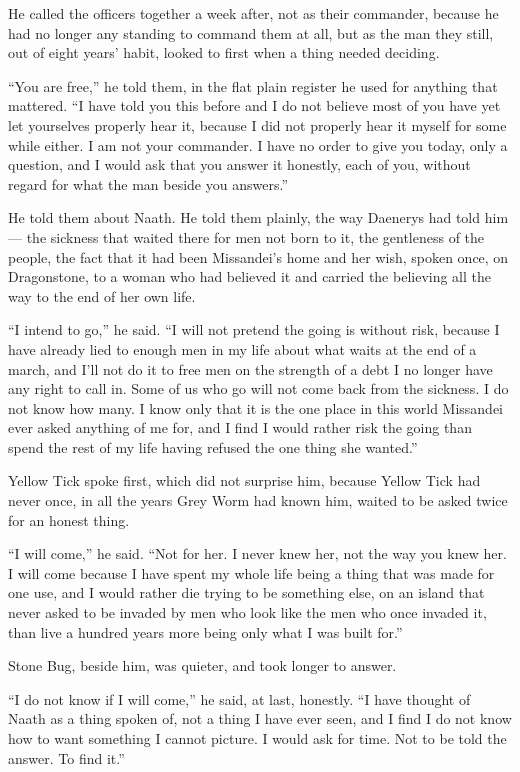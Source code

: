 \sceneBreak

He called the officers together a week after, not as their commander, because he had no longer any standing to command them at all, but as the man they still, out of eight years’ habit, looked to first when a thing needed deciding.

“You are free,” he told them, in the flat plain register he used for anything that mattered. “I have told you this before and I do not believe most of you have yet let yourselves properly hear it, because I did not properly hear it myself for some while either. I am not your commander. I have no order to give you today, only a question, and I would ask that you answer it honestly, each of you, without regard for what the man beside you answers.”

He told them about Naath. He told them plainly, the way Daenerys had told him — the sickness that waited there for men not born to it, the gentleness of the people, the fact that it had been Missandei’s home and her wish, spoken once, on Dragonstone, to a woman who had believed it and carried the believing all the way to the end of her own life.

“I intend to go,” he said. “I will not pretend the going is without risk, because I have already lied to enough men in my life about what waits at the end of a march, and I’ll not do it to free men on the strength of a debt I no longer have any right to call in. Some of us who go will not come back from the sickness. I do not know how many. I know only that it is the one place in this world Missandei ever asked anything of me for, and I find I would rather risk the going than spend the rest of my life having refused the one thing she wanted.”

\sceneBreak

Yellow Tick spoke first, which did not surprise him, because Yellow Tick had never once, in all the years Grey Worm had known him, waited to be asked twice for an honest thing.

“I will come,” he said. “Not for her. I never knew her, not the way you knew her. I will come because I have spent my whole life being a thing that was made for one use, and I would rather die trying to be something else, on an island that never asked to be invaded by men who look like the men who once invaded it, than live a hundred years more being only what I was built for.”

Stone Bug, beside him, was quieter, and took longer to answer.

“I do not know if I will come,” he said, at last, honestly. “I have thought of Naath as a thing spoken of, not a thing I have ever seen, and I find I do not know how to want something I cannot picture. I would ask for time. Not to be told the answer. To find it.”

